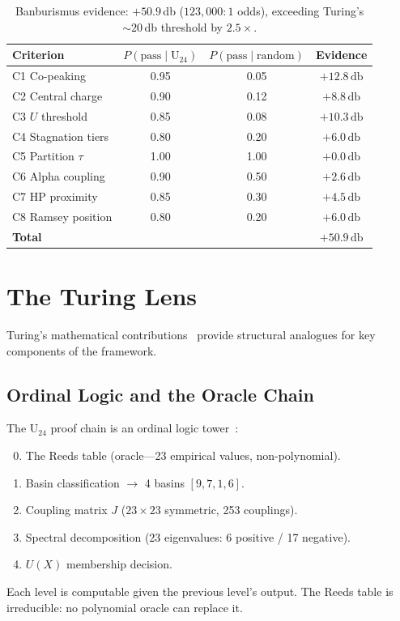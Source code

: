 \documentclass[11pt,a4paper]{article}
\theoremstyle{plain}
\theoremstyle{remark}
\newcommand{\db}{\,\mathrm{db}}
\begin{document}
\begin{table}[H]
\centering
\begin{tabular}{@{}lccc@{}}
\toprule
Criterion & $P(\text{pass}\mid\mathrm{U}_{24})$ &
            $P(\text{pass}\mid\text{random})$ & Evidence\\
\midrule
C1 Co-peaking       & 0.95 & 0.05 & $+12.8\db$\\
C2 Central charge   & 0.90 & 0.12 & $+8.8\db$\\
C3 $U$ threshold    & 0.85 & 0.08 & $+10.3\db$\\
C4 Stagnation tiers & 0.80 & 0.20 & $+6.0\db$\\
C5 Partition $\tau$  & 1.00 & 1.00 & $+0.0\db$\\
C6 Alpha coupling   & 0.90 & 0.50 & $+2.6\db$\\
C7 HP proximity     & 0.85 & 0.30 & $+4.5\db$\\
C8 Ramsey position  & 0.80 & 0.20 & $+6.0\db$\\
\midrule
\textbf{Total}      &      &      & $\mathbf{+50.9\db}$\\
\bottomrule
\end{tabular}
\caption{Banburismus evidence: $+50.9$\,db ($123{,}000{:}1$ odds),
  exceeding Turing's ${\sim}20$\,db threshold by $2.5\times$.}
\label{tab:banburismus}
\end{table}

\section{The Turing Lens}
\label{sec:turing}

Turing's mathematical contributions~\cite{turing1936,turing1939,turing1948,turing1952}
provide structural analogues for key components of the framework.

\subsection{Ordinal Logic and the Oracle Chain}

The $\mathrm{U}_{24}$ proof chain is an ordinal logic
tower~\cite{turing1939}:
\begin{enumerate}[label=\textbf{Level \arabic*:},leftmargin=4em,itemsep=2pt]
  \setcounter{enumi}{-1}
  \item The Reeds table (oracle---23 empirical values, non-polynomial).
  \item Basin classification $\to$ 4 basins $[9,7,1,6]$.
  \item Coupling matrix $J$ ($23\times 23$ symmetric, 253 couplings).
  \item Spectral decomposition (23 eigenvalues: 6 positive / 17 negative).
  \item $U(X)$ membership decision.
\end{enumerate}
Each level is computable given the previous level's output.  The Reeds
table is irreducible: no polynomial oracle can replace it.
\end{document}
